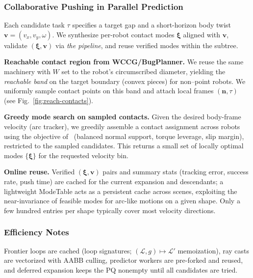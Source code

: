 \subsubsection{Collaborative Pushing in Parallel Prediction}
\label{subsubsec:mode-cache}
Each candidate task \(\tau\) specifies a target gap and a short-horizon body twist \(\mathbf{v}=(v_x,v_y,\omega)\).
We synthesize per-robot contact modes \(\boldsymbol{\xi}\) aligned with \(\mathbf{v}\), validate \((\boldsymbol{\xi},\mathbf{v})\) via \emph{the pipeline}, and reuse verified modes within the subtree.

\textbf{Reachable contact region from WCCG/BugPlanner.}
We reuse the same machinery with \(W\) set to the robot’s circumscribed diameter, yielding the \emph{reachable band} on the target boundary (convex pieces) for non–point robots.
We uniformly sample contact points on this band and attach local frames \((\mathbf{n},\tau)\) (see Fig.~\ref{fig:reach-contacts}).

\textbf{Greedy mode search on sampled contacts.}
Given the desired body-frame velocity (arc tracker), we greedily assemble a contact assignment across robots using the objective of~\cite{tang2024collaborative} (balanced normal support, torque leverage, slip margin), restricted to the sampled candidates. This returns a small set of locally optimal modes \(\{\boldsymbol{\xi}\}\) for the requested velocity bin.

\textbf{Online reuse.}
Verified \((\boldsymbol{\xi},\mathbf{v})\) pairs and summary stats (tracking error, success rate, push time) are cached for the current expansion and descendants; a lightweight ModeTable acts as a persistent cache across scenes, exploiting the near-invariance of feasible modes for arc-like motions on a given shape. Only a few hundred entries per shape typically cover most velocity directions.

\subsubsection{Efficiency Notes}
Frontier loops are cached (loop signatures; $(\mathcal{L},g)\!\mapsto\!\mathcal{L}'$ memoization), ray casts are vectorized with AABB culling, predictor workers are pre-forked and reused, and deferred expansion keeps the PQ nonempty until all candidates are tried.
